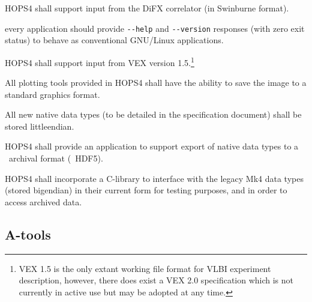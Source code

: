 \begin{description}

 HOPS4 shall support input from the DiFX \cite{deller2007difx,deller2011difx} correlator (in Swinburne format).

 every application should provide
    \verb+--help+ and \verb+--version+ responses (with zero exit status)
    to behave as conventional \acs{GNU/Linux} applications.

 HOPS4 shall support input from \acs{VEX} version 1.5.\footnote{\acs{VEX} 1.5
is the only extant working file format for VLBI experiment description, however, there does
exist a VEX 2.0 specification which is not currently in active use but may be adopted at any time.}


 All plotting tools provided in HOPS4 shall have the ability to save the image to 
a standard graphics format.


 All new native data types (to be detailed in the specification document)
shall be stored \acs{littleendian}.

 HOPS4 shall provide an application to support export of native
data types to a \TBD~archival format (\eg~HDF5).

 HOPS4 shall incorporate a C-library to interface with the legacy 
\acs{Mk4} data types (stored \acs{bigendian}) in their current form for 
testing purposes, and in order to access archived data. 

\end{description}




\subsection{A-tools}
\label{sec:areq}

